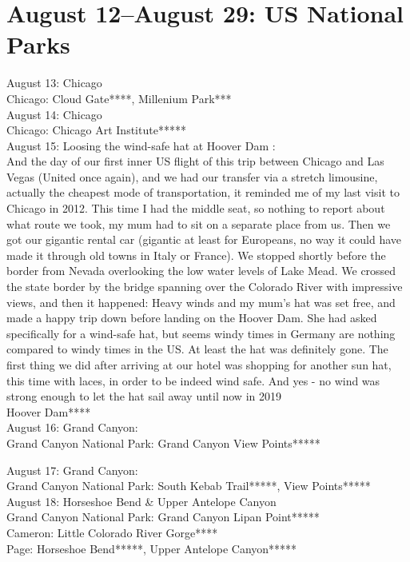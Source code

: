 \section{August 12--August 29: US National Parks}
\label{US2016}

August 13: Chicago\\
Chicago: Cloud Gate****, Millenium Park***\\

August 14: Chicago\\
Chicago: Chicago Art Institute*****\\

August 15: Loosing the wind-safe hat at Hoover Dam : \\
And the day of our first inner US flight of this trip between Chicago and Las Vegas (United once again), and we had our transfer via a stretch limousine, actually the cheapest mode of transportation, it reminded me of my last visit to Chicago in 2012. This time I had the middle seat, so nothing to report about what route we took, my mum had to sit on a separate place from us. Then we got our gigantic rental car (gigantic at least for Europeans, no way it could have made it through old towns in Italy or France). We stopped shortly before the border from Nevada overlooking the low water levels of Lake Mead. We crossed the state border by the bridge spanning over the Colorado River with impressive views, and then it happened: Heavy winds and my mum's hat was set free, and made a happy trip down before landing on the Hoover Dam. She had asked specifically for a wind-safe hat, but seems windy times in Germany are nothing compared to windy times in the US. At least the hat was definitely gone. The first thing we did after arriving at our hotel was shopping for another sun hat, this time with laces, in order to be indeed wind safe. And yes - no wind was strong enough to let the hat sail away until now in 2019\\

Hoover Dam****\\

August 16: Grand Canyon:\\
Grand Canyon National Park: Grand Canyon View Points*****

August 17: Grand Canyon:\\
Grand Canyon National Park: South Kebab Trail*****, View Points*****\\

August 18: Horseshoe Bend \& Upper Antelope Canyon\\
Grand Canyon National Park: Grand Canyon Lipan Point*****\\
Cameron: Little Colorado River Gorge****\\
Page: Horseshoe Bend*****, Upper Antelope Canyon*****\\

